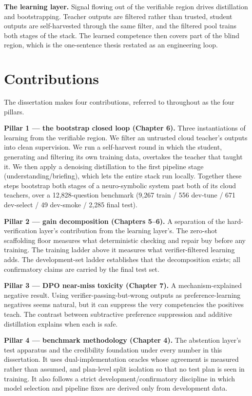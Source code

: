\documentclass[10pt]{article} %
\begin{document}
\textbf{The learning layer.} Signal flowing out of the verifiable region drives distillation and bootstrapping. Teacher outputs are filtered rather than trusted, student outputs are self-harvested through the same filter, and the filtered pool trains both stages of the stack. The learned competence then covers part of the blind region, which is the one-sentence thesis restated as an engineering loop.

\section{Contributions}\label{sec:contributions}

The dissertation makes four contributions, referred to throughout as the four pillars.

\textbf{Pillar 1 --- the bootstrap closed loop (Chapter 6).} Three instantiations of learning from the verifiable region. We filter an untrusted cloud teacher's outputs into clean supervision. We run a self-harvest round in which the student, generating and filtering its own training data, overtakes the teacher that taught it. We then apply a denoising distillation to the first pipeline stage (understanding/briefing), which lets the entire stack run locally. Together these steps bootstrap both stages of a neuro-symbolic system past both of its cloud teachers, over a 12,828-question benchmark (9,267 train / 556 dev-tune / 671 dev-select / 49 dev-smoke / 2,285 final test).

\textbf{Pillar 2 --- gain decomposition (Chapters 5--6).} A separation of the hard-verification layer's contribution from the learning layer's. The zero-shot scaffolding floor measures what deterministic checking and repair buy before any training. The training ladder above it measures what verifier-filtered learning adds. The development-set ladder establishes that the decomposition exists; all confirmatory claims are carried by the final test set.

\textbf{Pillar 3 --- DPO near-miss toxicity (Chapter 7).} A mechanism-explained negative result. Using verifier-passing-but-wrong outputs as preference-learning negatives seems natural, but it can suppress the very competencies the positives teach. The contrast between subtractive preference suppression and additive distillation explains when each is safe.

\textbf{Pillar 4 --- benchmark methodology (Chapter 4).} The abstention layer's test apparatus and the credibility foundation under every number in this dissertation. It uses dual-implementation oracles whose agreement is measured rather than assumed, and plan-level split isolation so that no test plan is seen in training. It also follows a strict development/confirmatory discipline in which model selection and pipeline fixes are derived only from development data.
\end{document}
